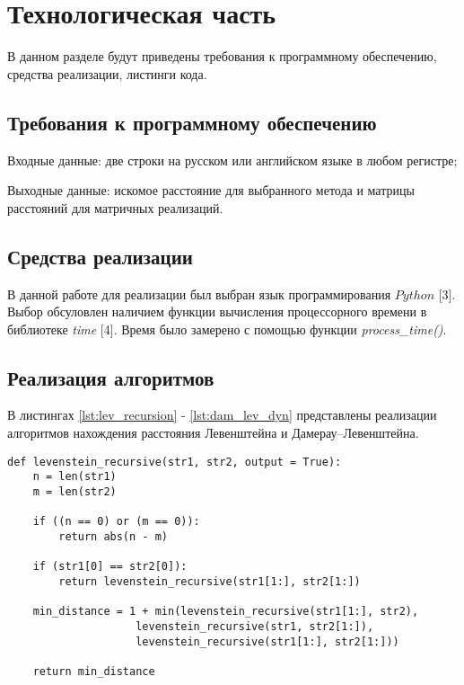 \chapter{Технологическая часть}

В данном разделе будут приведены требования к программному обеспечению, средства реализации, листинги кода.

\section{Требования к программному обеспечению}

Входные данные: две строки на русском или английском языке в любом регистре;

Выходные данные: искомое расстояние для выбранного метода и матрицы расстояний для матричных реализаций.

\section{Средства реализации}
В данной работе для реализации был выбран язык программирования $Python$ [3]. Выбор обсуловлен наличием функции вычисления процессорного времени в библиотеке \textit{time} [4]. Время было замерено с помощью функции \textit{process\_time()}.

\section{Реализация алгоритмов}

В листингах \ref{lst:lev_recursion} - \ref{lst:dam_lev_dyn} представлены реализации алгоритмов нахождения расстояния Левенштейна и Дамерау–Левенштейна.

\clearpage

\begin{center}
\captionsetup{justification=raggedright,singlelinecheck=off}
\begin{lstlisting}[label=lst:lev_recursion,caption=Функция нахождения расстояния Левенштейна рекурсивно]
def levenstein_recursive(str1, str2, output = True):
    n = len(str1)
    m = len(str2)

    if ((n == 0) or (m == 0)):
        return abs(n - m)

    if (str1[0] == str2[0]):
        return levenstein_recursive(str1[1:], str2[1:])

    min_distance = 1 + min(levenstein_recursive(str1[1:], str2),
                    levenstein_recursive(str1, str2[1:]),
                    levenstein_recursive(str1[1:], str2[1:]))

    return min_distance
\end{lstlisting}
\end{center}


